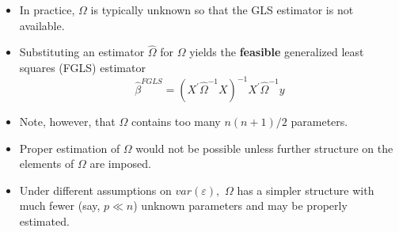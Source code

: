 \documentclass[notes=show]{beamer}
\begin{document}
\begin{frame}%


\begin{itemize}
\item In practice, $\Omega $ is typically unknown so that the GLS estimator
is not available.

\item Substituting an estimator $\widehat{\Omega }$ for $\Omega $ yields the 
\textbf{feasible} generalized least squares (FGLS) estimator%
\begin{equation*}
\widehat{\beta }^{FGLS}=(X^{\prime }\widehat{\Omega }^{-1}X)^{-1}X^{\prime }%
\widehat{\Omega }^{-1}y
\end{equation*}

\item Note, however, that $\Omega $ contains too many $n(n+1)/2$ parameters.

\item Proper estimation of $\Omega $ would not be possible unless further
structure on the elements of $\Omega $ are imposed.

\item Under different assumptions on $var(\varepsilon ),$ $\Omega $ has a
simpler structure with much fewer (say, $p\ll n$) unknown parameters and may
be properly estimated.
\end{itemize}

\end{frame}%
\end{document}
